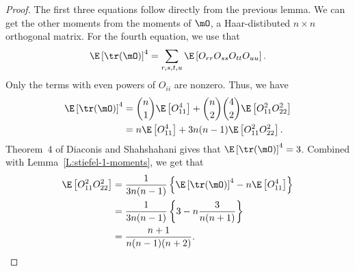 \begin{proof}
    The first three equations follow directly from the previous lemma.
    We can get the other moments from the moments of $\mO$, a Haar-distibuted
    $n \times n$ orthogonal matrix. For the fourth equation, we use that 
    \[
        \E \left[ \tr( \mO ) \right]^4
        =
        \sum_{r,s,t,u} \E \left[ O_{rr} O_{ss} O_{tt} O_{uu} \right].
    \]
    Only the terms with even powers of $O_{ii}$ are nonzero.  Thus, we have
    \begin{align*}
        \E \left[ \tr( \mO ) \right]^4
        &=   \binom{n}{1} \E \left[ O_{11}^4 \right]
           + \binom{n}{2} \binom{4}{2} \E \left[ O_{11}^2 O_{22}^2 \right] \\
        &=   n \E \left[ O_{11}^4 \right]
           + 3n(n-1) \E \left[ O_{11}^2 O_{22}^2 \right].
    \end{align*}
    Theorem~4 of Diaconis and Shahshahani \cite{diaconis1994erm} gives that 
    $\E \left[ \tr(\mO) \right]^4 = 3$.  Combined with
    Lemma~\ref{L:stiefel-1-moments}, we get that
    \begin{align*}
        \E \left[ O_{11}^2 O_{22}^2 \right]
        &= \frac{1}{3n(n-1)} 
            \left\{
                \E \left[ \tr(\mO) \right]^4
                - n \E \left[ O_{11}^4 \right]
            \right\} \\
        &= \frac{1}{3n(n-1)} 
           \left\{
                3 - n \frac{3}{n(n+1)}
           \right\} \\
        &= \frac{n+1}{n(n-1)(n+2)}.
    \end{align*}
    

\end{proof}
